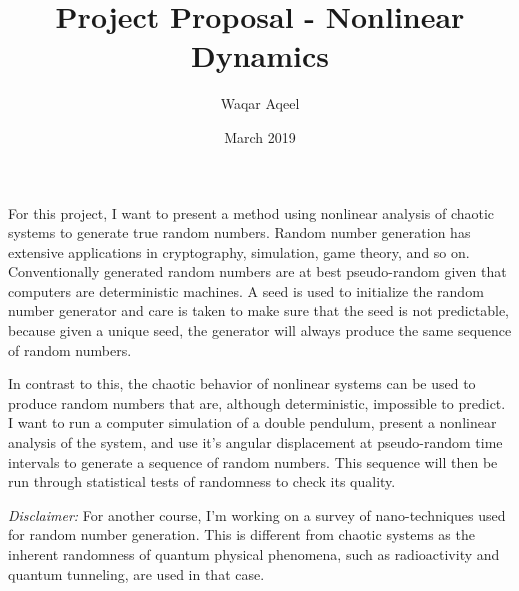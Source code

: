 \documentclass{article}
\author{Waqar Aqeel}
\date{March 2019}
\title{Project Proposal - Nonlinear Dynamics}
\begin{document}
\maketitle

For this project, I want to present a method using nonlinear analysis of chaotic systems to generate true random numbers.
Random number generation has extensive applications in cryptography, simulation, game theory, and so on.
Conventionally generated random numbers are at best pseudo-random given that computers are deterministic machines. A seed is
used to initialize the random number generator and care is taken to make sure that the seed is not predictable, because
given a unique seed, the generator will always produce the same sequence of random numbers.

\bigbreak
In contrast to this, the chaotic behavior of nonlinear systems can be used to produce random numbers that are, although
deterministic, impossible to predict. I want to run a computer simulation of a double pendulum, present a nonlinear analysis
of the system, and use it's angular displacement at pseudo-random time intervals to generate a sequence of random numbers.
This sequence will then be run through statistical tests of randomness to check its quality.

\bigbreak
\bigbreak
\textit{Disclaimer:} For another course, I'm working on a survey of nano-techniques used for random number generation.
This is different from chaotic systems as the inherent randomness of quantum physical phenomena, such as
radioactivity and quantum tunneling, are used in that case.
\end{document}
